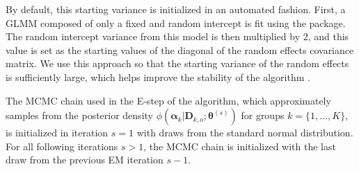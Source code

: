 By default, this starting variance is initialized in an automated fashion. First, a GLMM composed of only a fixed and random intercept is fit using the  package. The random intercept variance from this model is then multiplied by 2, and this value is set as the starting values of the diagonal of the random effects covariance matrix. We use this approach so that the starting variance of the random effects is sufficiently large, which helps improve the stability of the algorithm \citep{misztal2008reliable}. 


The MCMC chain used in the E-step of the algorithm, which approximately samples from the posterior density $\phi(\boldsymbol \alpha_k|\boldsymbol D_{k,o}; \boldsymbol \theta^{(s)})$ for groups $k=\{1,...,K\}$, is initialized in iteration $s=1$ with draws from the standard normal distribution. For all following iterations $s>1$, the MCMC chain is initialized with the last draw from the previous EM iteration $s-1$. 

